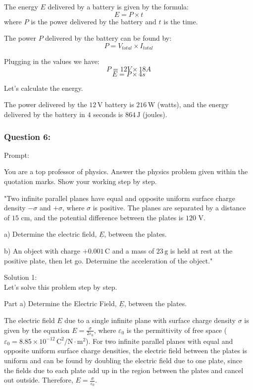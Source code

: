 \documentclass[a4paper,11pt]{article}
\begin{document}
The energy \(E\) delivered by a battery is given by the formula:
\[ E = P \times t \]
where \(P\) is the power delivered by the battery and \(t\) is the time.

The power \(P\) delivered by the battery can be found by:
\[ P = V_{total} \times I_{total} \]

Plugging in the values we have:
\[ P = 12V \times 18A \]
\[ E = P \times 4s \]

Let's calculate the energy.

The power delivered by the \(12\, \text{V}\) battery is \(216 \, \text{W}\) (watts), and the energy delivered by the battery in \(4\) seconds is \(864 \, \text{J}\) (joules).

\subsubsection*{Question 6:}

Prompt: 
\begin{spverbatim}
    You are a top professor of physics. Answer the physics problem given within the quotation marks. Show your working step by step.

    "Two infinite parallel planes have equal and opposite uniform surface charge density \( -\sigma \) and \( +\sigma \), where \( \sigma \) is positive. The planes are separated by a distance of \( 15 \) cm, and the potential difference between the plates is \( 120 \) V. 

    a) Determine the electric field, \( \underline{E} \), between the plates.

    b) An object with charge \( +0.001 \, \text{C} \) and a mass of \( 23 \, \text{g} \) is held at rest at the positive plate, then let go. Determine the acceleration of the object."
\end{spverbatim} 

\bigskip

\noindent Solution 1: \\

Let's solve this problem step by step.

Part a) Determine the Electric Field, \( \underline{E} \), between the plates.

The electric field \( E \) due to a single infinite plane with surface charge density \( \sigma \) is given by the equation \( E = \frac{\sigma}{2\varepsilon_0} \), where \( \varepsilon_0 \) is the permittivity of free space (\( \varepsilon_0 = 8.85 \times 10^{-12} \, \text{C}^2/\text{N}\cdot\text{m}^2 \)). For two infinite parallel planes with equal and opposite uniform surface charge densities, the electric field between the plates is uniform and can be found by doubling the electric field due to one plate, since the fields due to each plate add up in the region between the plates and cancel out outside. Therefore, \( E = \frac{\sigma}{\varepsilon_0} \).
\end{document}
